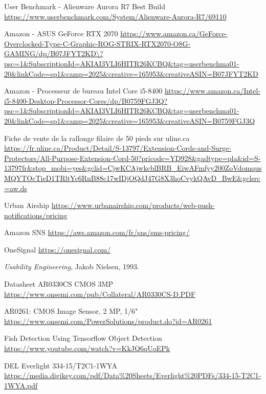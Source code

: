 \begin{thebibliographyUL}{9}
 User Benchmark - Alienware Aurora R7 Best Build
\url{https://www.userbenchmark.com/System/Alienware-Aurora-R7/69110}

 Amazon - ASUS GeForce RTX 2070 \url{https://www.amazon.ca/GeForce-Overclocked-Type-C-Graphic-ROG-STRIX-RTX2070-O8G-GAMING/dp/B07JFYT2KD\?psc=1\&SubscriptionId=AKIAI3VLI6HITR26KCBQ\&tag=userbenchma01-20\&linkCode=sp1\&camp=2025\&creative=165953\&creativeASIN=B07JFYT2KD}

 Amazon - Processeur de bureau Intel Core i5-8400 \url{https://www.amazon.ca/Intel-i5-8400-Desktop-Processor-Cores/dp/B0759FGJ3Q?psc=1\&SubscriptionId=AKIAI3VLI6HITR26KCBQ\&tag=userbenchma01-20\&linkCode=sp1\&camp=2025\&creative=165953\&creativeASIN=B0759FGJ3Q}

 Fiche de vente de la rallonge filaire de 50 pieds sur uline.ca 
\url{https://fr.uline.ca/Product/Detail/S-13797/Extension-Cords-and-Surge-Protectors/All-Purpose-Extension-Cord-50?pricode=YD928&gadtype=pla&id=S-13797fr&stop_mobi=yes&gclid=CjwKCAjwkcblBRB_EiwAFmfyy200ZoVdomqusMQYTOcTieD1TRltYc6RnB88c17wIDjOQdJ47G8X3hoCvykQAvD_BwE&gclsrc=aw.ds}

 Urban Airship \url{https://www.urbanairship.com/products/web-push-notifications/pricing}

 Amazon SNS \url{https://aws.amazon.com/fr/sns/sms-pricing/}

 OneSignal \url{https://onesignal.com/}

 \emph{Usability Engineering}, Jakob Nielsen, 1993.

 Datasheet AR0330CS CMOS 3MP  \url{https://www.onsemi.com/pub/Collateral/AR0330CS-D.PDF}

 AR0261: CMOS Image Sensor, 2 MP, 1/6" \url{https://www.onsemi.com/PowerSolutions/product.do?id=AR0261}

 Fish Detection Using Tensorflow Object Detection
 \url{https://www.youtube.com/watch?v=KkJQ6qUoEPk}
 
 DEL Everlight 334-15/T2C1-1WYA \url{https://media.digikey.com/pdf/Data\%20Sheets/Everlight\%20PDFs/334-15-T2C1-1WYA.pdf}

\end{thebibliographyUL}